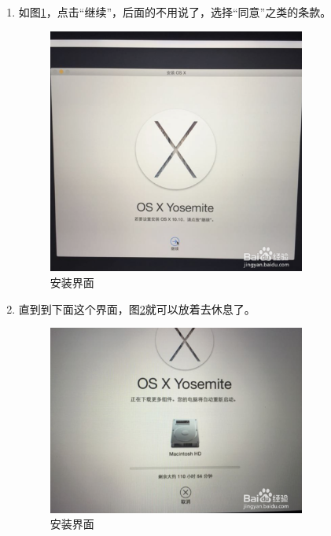 \documentclass{article}
\begin{document}
\begin{enumerate}
\begin{figure}[!htb]
 \end{figure}

\item 如图\ref{jixuanzhuang}，点击“继续”，后面的不用说了，选择“同意”之类的条款。
 \begin{figure}[!htb] %
 \centering
 \includegraphics[width=0.8\textwidth]{figures/jixu.png}
 \caption{安装界面}
\label{jixuanzhuang}
 
 \end{figure}

\item 直到到下面这个界面，图\ref{anzhuang}就可以放着去休息了。
 \begin{figure}[!htb] %
 \centering
 \includegraphics[width=0.8\textwidth]{figures/anzhuang.png}
 \caption{安装界面}
\label{anzhuang}
 
 \end{figure}

\end{enumerate}
\end{document}

